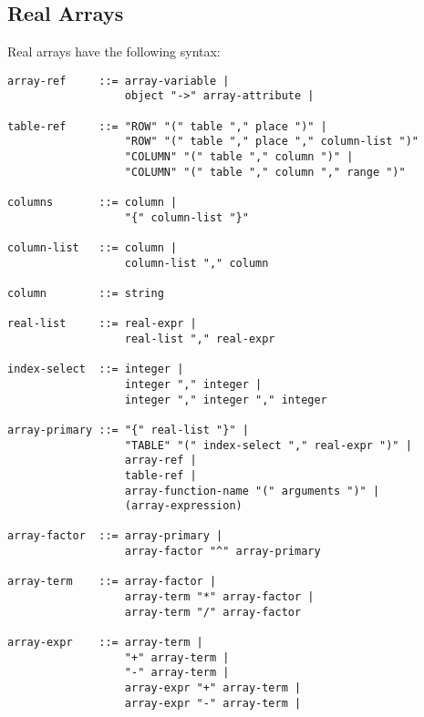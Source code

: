\subsection{Real Arrays}
\label{sec:realarray}
Real arrays have the following syntax:
\begin{footnotesize}
\begin{verbatim}
array-ref     ::= array-variable |
                  object "->" array-attribute |

table-ref     ::= "ROW" "(" table "," place ")" |
                  "ROW" "(" table "," place "," column-list ")"
                  "COLUMN" "(" table "," column ")" |
                  "COLUMN" "(" table "," column "," range ")"

columns       ::= column |
                  "{" column-list "}"

column-list   ::= column |
                  column-list "," column

column        ::= string

real-list     ::= real-expr |
                  real-list "," real-expr

index-select  ::= integer |
                  integer "," integer |
                  integer "," integer "," integer

array-primary ::= "{" real-list "}" |
                  "TABLE" "(" index-select "," real-expr ")" |
                  array-ref |
                  table-ref |
                  array-function-name "(" arguments ")" |
                  (array-expression)

array-factor  ::= array-primary |
                  array-factor "^" array-primary

array-term    ::= array-factor |
                  array-term "*" array-factor |
                  array-term "/" array-factor

array-expr    ::= array-term |
                  "+" array-term |
                  "-" array-term |
                  array-expr "+" array-term |
                  array-expr "-" array-term |
\end{verbatim}
\end{footnotesize}

